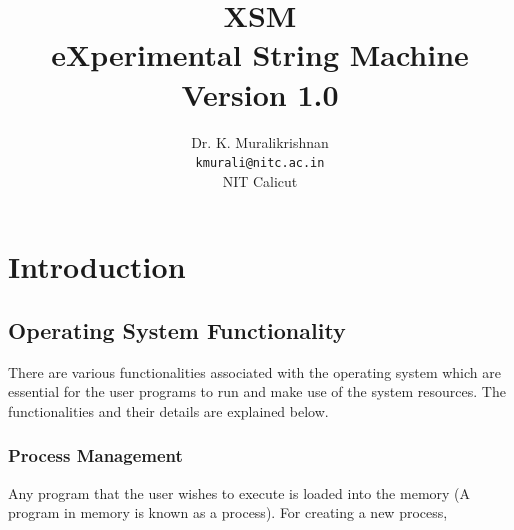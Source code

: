 \documentclass[11pt]{report}
\title{XSM \\ eXperimental String Machine \\
Version 1.0}
\author{Dr. K. Muralikrishnan  \\ \texttt{kmurali@nitc.ac.in} \\ {NIT Calicut} }
\begin{document}
\maketitle
\pagebreak

\thispagestyle{plain}

\tableofcontents
\pagebreak

\chapter{Introduction}
\label{chp:osintro}
%
%

\section{Operating System Functionality}
There are various functionalities associated with the operating system which are essential for the user programs to run and make use of the system resources. The functionalities and their details are explained below.

\subsection{Process Management}
Any program that the user wishes to execute is loaded into the memory (A program in memory is known as a process). For creating a new process,
\end{document}
